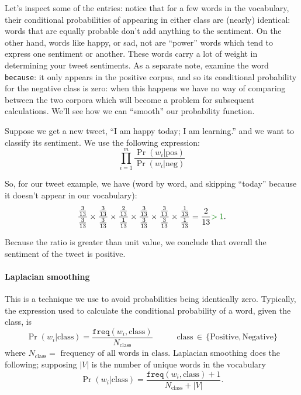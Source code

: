 \documentclass[12pt]{article}
\begin{document}
Let's inspect some of the entries: notice that for a few words in the vocabulary, their conditional probabilities of appearing in either class are (nearly) identical: words that are equally probable don't add anything to the sentiment. On the other hand, words like {\color{green!50!black} happy}, or {\color{purple!90} sad, not} are ``power'' words which tend to express one sentiment or another. These words carry a lot of weight in determining your tweet sentiments. As a separate note, examine the word \texttt{because}: it only appears in the positive corpus, and so its conditional probability for the negative class is zero: when this happens we have no way of comparing between the two corpora which will become a problem for subsequent calculations. We'll see how we can ``smooth'' our probability function.

Suppose we get a new tweet, ``I am happy today; I am learning.'' and we want to classify its sentiment. We use the following expression:
\[
  \prod_{i=1}^{m} \frac{\Pr(w_i | \textrm{pos})}{\Pr(w_i|\textrm{neg})}
\]

So, for our tweet example, we have (word by word, and skipping ``today'' because it doesn't appear in our vocabulary):
\[
  \frac{\frac{3}{13}}{\frac{3}{13}} \times \frac{\frac{3}{13}}{\frac{3}{13}} \times \frac{\frac{2}{13}}{\frac{1}{13}} \times \frac{\frac{3}{13}}{\frac{3}{13}} \times \frac{\frac{3}{13}}{\frac{3}{13}} \times \frac{\frac{1}{13}}{\frac{1}{13}} = \frac{2}{13} {\color{green!50!black} > 1}.
\]

Because the ratio is greater than unit value, we conclude that overall the sentiment of the tweet is positive.

\paragraph{Laplacian smoothing} This is a technique we use to avoid probabilities being identically zero. Typically, the expression used to calculate the conditional probability of a word, given the class, is
\[
  \Pr(w_i | \textrm{class}) = \frac{\texttt{freq}(w_i, \textrm{class})}{N_{\textrm{class}}} \hspace{35pt} \textrm{class} \, \in \, \{\textrm{Positive}, \textrm{Negative}\}
\]
where $N_{\textrm{class}} = \textrm{ frequency of all words in class}$. Laplacian smoothing does the following; supposing $|V|$ is the number of unique words in the vocabulary
\begin{equation}
  \label{eq: laplaciansmoothing}
  \Pr(w_i | \textrm{class}) = \frac{\texttt{freq}(w_i, \textrm{class}) + 1}{N_{\textrm{class}} + |V|}.  
\end{equation}
\end{document}
